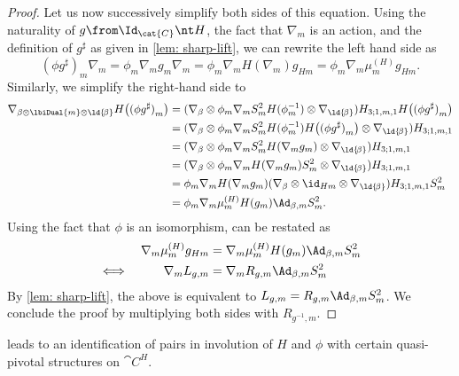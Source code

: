 \begin{proof}
  Let us now successively simplify both sides of this equation.
  Using the naturality of \(g \from \Id_{\cat{C}} \nt H\),
  the fact that \(\nabla_m\) is an action,
  and the definition of \(g^{\sharp}\) as given in \cref{lem: sharp-lift},
  we can rewrite the left hand side as
  \[
    {(\phi g^{\sharp})}_m \nabla_m
    = \phi_m \nabla_m g_m \nabla_m
    = \phi_m \nabla_m H(\nabla_m) g_{Hm}
    = \phi_m \nabla_m \mu^{(H)}_m g_{Hm}.
  \]
  Similarly, we simplify the right-hand side to
  \begin{align*}
    \nabla_{\beta \otimes \lbiDual{m} \otimes \ld{\!\beta}}H\big( {(\phi g^{\sharp})}_m \big)
    & = (\nabla_{\beta} \otimes \phi_m \nabla_m S^2_m H(\phi^{-1}_m) \otimes \nabla_{\ld{\!\beta}}) H_{3; 1,m,1} H\big( {(\phi g^{\sharp})}_m \big) \\
    & = (\nabla_{\beta} \otimes \phi_m \nabla_m  S^2_m H(\phi^{-1}_m) H\big( {(\phi g^{\sharp})}_m\big) \otimes \nabla_{\ld{\!\beta}}) H_{3;1,m,1} \\
    & = (\nabla_{\beta} \otimes \phi_m \nabla_m  S^2_m H(\nabla_m g_m ) \otimes \nabla_{\ld{\!\beta}}) H_{3;1,m,1} \\
    & = (\nabla_{\beta} \otimes \phi_m \nabla_m   H(\nabla_m g_m ) S^2_m \otimes \nabla_{\ld{\!\beta}}) H_{3;1,m,1} \\
    & = \phi_m \nabla_m   H(\nabla_m g_m ) (\nabla_{\beta} \otimes  \id_{Hm}\otimes \nabla_{\ld{\!\beta}}) H_{3;1,m,1}S^2_m \\
    & = \phi_m \nabla_{m}\mu^{(H)}_m H(g_m) \Ad_{\beta,m} S^2_m .
  \end{align*}
  Using the fact that \(\phi\) is an isomorphism,
   can be restated as
  \begin{align*}
    & & \nabla_m \mu^{(H)}_m g_{Hm} &= \nabla_m\mu^{(H)}_m H(g_m)  \Ad_{\beta,m} S^2_m \\
    \iff & & \nabla_m L_{g, m} &= \nabla_m R_{g, m} \Ad_{\beta, m} S^2_m
  \end{align*}
  By \cref{lem: sharp-lift},
  the above is equivalent to
  \(L_{g, m} = R_{g, m} \Ad_{\beta, m} S^2_m\).
  We conclude the proof by multiplying both sides with \(R_{g^{-1}, m}\).
\end{proof}

 leads to an identification of pairs in involution of \(H\) and \(\phi\)
with certain quasi-pivotal structures on \(\cat{C}^H\).

